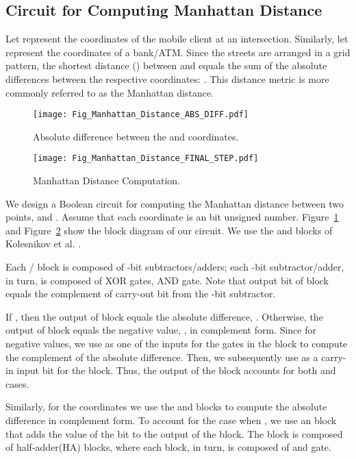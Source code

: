 \documentclass[10pt,journal,cspaper,compsoc]{IEEEtran}
\begin{document}
\subsection{Circuit for Computing Manhattan Distance}

Let  represent the coordinates of the mobile client at an intersection. Similarly, let  represent the coordinates of a bank/ATM. Since the streets are arranged in a grid pattern, the shortest distance () between  and  equals the sum of the absolute differences between the respective coordinates: . This distance metric is more commonly referred to as the Manhattan distance.

\begin{figure}[t]
\centering
\texttt{[image: Fig\_Manhattan\_Distance\_ABS\_DIFF.pdf]}
\caption{Absolute difference between the  and  coordinates.}\label{fig_absolute_diff}
\end{figure}

\begin{figure}[t]
\centering
\texttt{[image: Fig\_Manhattan\_Distance\_FINAL\_STEP.pdf]}
\caption{Manhattan Distance Computation.}\label{fig_manhattan_dist_final_step}
\end{figure}


We design a Boolean circuit for computing the Manhattan distance between two points,  and . Assume that each coordinate is an  bit unsigned number. Figure~\ref{fig_absolute_diff} and Figure~\ref{fig_manhattan_dist_final_step} show the block diagram of our circuit. We use the  and  blocks of Kolesnikov et al. \cite{kolesnikov09}.


Each / block is composed of  -bit subtractors/adders; each -bit subtractor/adder, in turn, is composed of  XOR gates,  AND gate. Note that  output bit of  block equals the complement of carry-out bit from the  -bit subtractor.


If , then the output of  block equals the absolute difference, . Otherwise, the output of  block equals the negative value, , in  complement form. Since  for negative values, we use  as one of the inputs for the  gates in the  block to compute the  complement of the absolute difference. Then, we subsequently use  as a carry-in input bit for the  block. Thus, the output of the  block accounts for both  and  cases.


Similarly, for the  coordinates we use the  and  blocks to compute the absolute difference in  complement form. To account for the case when , we use an  block that adds the value of the bit  to the output of the  block. The  block is composed of  half-adder(HA) blocks, where each  block, in turn, is composed of   and   gate.
\end{document}
